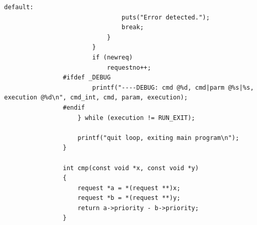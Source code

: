 \documentclass{article}
\begin{document}
\begin{Verbatim}[gobble=8]
                            default:
                                puts("Error detected.");
                                break;
                            }
                        }
                        if (newreq)
                            requestno++;
                #ifdef _DEBUG
                        printf("----DEBUG: cmd @%d, cmd|parm @%s|%s, execution @%d\n", cmd_int, cmd, param, execution);
                #endif
                    } while (execution != RUN_EXIT);
                
                    printf("quit loop, exiting main program\n");
                }
                
                int cmp(const void *x, const void *y)
                {
                    request *a = *(request **)x;
                    request *b = *(request **)y;
                    return a->priority - b->priority;
                }
                

\end{Verbatim}
\end{document}
